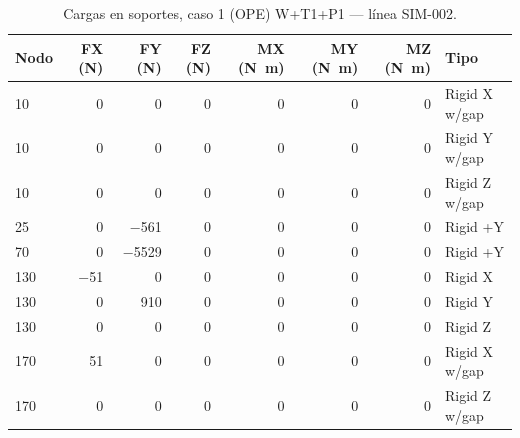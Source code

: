 \begin{table}[htbp]
  \centering
  \footnotesize
  \caption{Cargas en soportes, caso 1 (OPE) W+T1+P1 — línea SIM-002.}
  \label{tab:restricciones-ope}
  \begin{tabular}{lrrrrrrl}
    \toprule
    Nodo & FX (\si{N}) & FY (\si{N}) & FZ (\si{N}) & MX (\si{N.m}) & MY (\si{N.m}) & MZ (\si{N.m}) & Tipo \\
    \midrule
    10 & \num{0} & \num{0} & \num{0} & \num{0} & \num{0} & \num{0} & Rigid X w/gap \\
    10 & \num{0} & \num{0} & \num{0} & \num{0} & \num{0} & \num{0} & Rigid Y w/gap \\
    10 & \num{0} & \num{0} & \num{0} & \num{0} & \num{0} & \num{0} & Rigid Z w/gap \\
    25 & \num{0} & \num{-561} & \num{0} & \num{0} & \num{0} & \num{0} & Rigid +Y \\
    70 & \num{0} & \num{-5529} & \num{0} & \num{0} & \num{0} & \num{0} & Rigid +Y \\
    130 & \num{-51} & \num{0} & \num{0} & \num{0} & \num{0} & \num{0} & Rigid X \\
    130 & \num{0} & \num{910} & \num{0} & \num{0} & \num{0} & \num{0} & Rigid Y \\
    130 & \num{0} & \num{0} & \num{0} & \num{0} & \num{0} & \num{0} & Rigid Z \\
    170 & \num{51} & \num{0} & \num{0} & \num{0} & \num{0} & \num{0} & Rigid X w/gap \\
    170 & \num{0} & \num{0} & \num{0} & \num{0} & \num{0} & \num{0} & Rigid Z w/gap \\
    \bottomrule
  \end{tabular}
\end{table}
